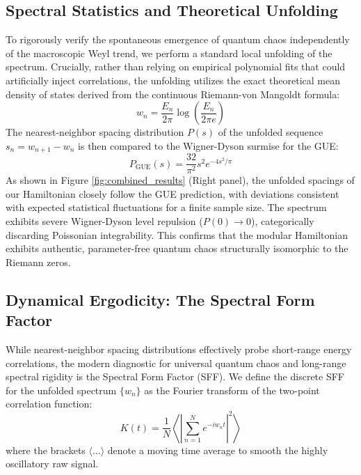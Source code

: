 \documentclass[aps,prl,preprint,superscriptaddress,floatfix]{revtex4-2}
\begin{document}
\subsection{Spectral Statistics and Theoretical Unfolding}
To rigorously verify the spontaneous emergence of quantum chaos independently of the macroscopic Weyl trend, we perform a standard local unfolding of the spectrum. Crucially, rather than relying on empirical polynomial fits that could artificially inject correlations, the unfolding utilizes the exact theoretical mean density of states derived from the continuous Riemann-von Mangoldt formula:
\begin{equation}
w_n = \frac{E_n}{2\pi} \log\left(\frac{E_n}{2\pi e}\right)
\end{equation}
The nearest-neighbor spacing distribution $P(s)$ of the unfolded sequence $s_n = w_{n+1} - w_n$ is then compared to the Wigner-Dyson surmise for the GUE:
\begin{equation}
P_{\text{GUE}}(s) = \frac{32}{\pi^2} s^2 e^{-4s^2/\pi}
\end{equation}
As shown in Figure \ref{fig:combined_results} (Right panel), the unfolded spacings of our Hamiltonian closely follow the GUE prediction, with deviations consistent with expected statistical fluctuations for a finite sample size. The spectrum exhibits severe Wigner-Dyson level repulsion ($P(0) \to 0$), categorically discarding Poissonian integrability. This confirms that the modular Hamiltonian exhibits authentic, parameter-free quantum chaos structurally isomorphic to the Riemann zeros.

\subsection{Dynamical Ergodicity: The Spectral Form Factor}

While nearest-neighbor spacing distributions effectively probe short-range energy correlations, the modern diagnostic for universal quantum chaos and long-range spectral rigidity is the Spectral Form Factor (SFF). We define the discrete SFF for the unfolded spectrum $\{w_n\}$ as the Fourier transform of the two-point correlation function:
\begin{equation}
K(t) = \frac{1}{N} \left\langle \left| \sum_{n=1}^N e^{-i w_n t} \right|^2 \right\rangle
\end{equation}
where the brackets $\langle \dots \rangle$ denote a moving time average to smooth the highly oscillatory raw signal.
\end{document}
